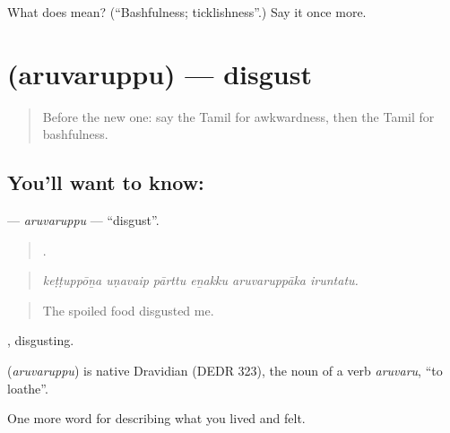 \begin{tcolorbox}[breakable,colback=teal!4,colframe=teal!35!black,title={Before you move on}]
What does  mean? (\textquotedblleft{}Bashfulness; ticklishness\textquotedblright{}.) Say it once more.
\end{tcolorbox}
\section[\texorpdfstring{\ta{அருவருப்பு} (aruvaruppu)}{அருவருப்பு (aruvaruppu)}]{ (aruvaruppu) — disgust}

\label{lesson:TA-C462-aruvaruppu}



\begin{quote}
Before the new one: say the Tamil for awkwardness, then the Tamil for bashfulness.
\end{quote}

\subsection*{You'll want to know: }
\textbf{} — \emph{aruvaruppu} — \textquotedblleft{}disgust\textquotedblright{}.

\begin{quote}
     .
\end{quote}

\begin{quote}
\emph{keṭṭuppōṉa uṇavaip pārttu eṉakku aruvaruppāka iruntatu.}
\end{quote}

\begin{quote}
The spoiled food disgusted me.
\end{quote}

, disgusting.

\begin{cousinweb}
\textbf{} (\emph{aruvaruppu}) is native Dravidian (DEDR 323), the noun of a verb  \emph{aruvaru}, \textquotedblleft{}to loathe\textquotedblright{}.
\end{cousinweb}

\begin{grammarlens}[title={What you've built}]
One more word for describing what you lived and felt.
\end{grammarlens}

